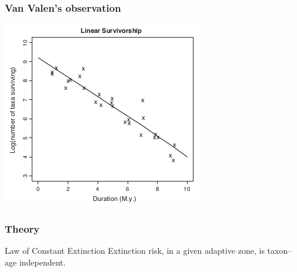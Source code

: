 \documentclass{beamer}
\begin{document}
\begin{frame}
  \frametitle{Van Valen's observation}

  \begin{center}
    \includegraphics[height = 0.7\textheight, keepaspectratio = true]{figure/liow}

    \tiny{}
  \end{center}
\end{frame}

\begin{frame}
  \frametitle{Theory}

  \begin{alertblock}{Law of Constant Extinction}
    Extinction risk, in a given adaptive zone, is taxon--age independent.
  \end{alertblock}

  \tiny{}

\end{frame}
\end{document}
